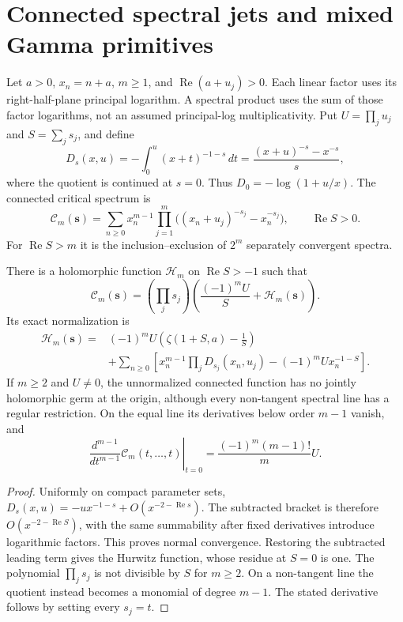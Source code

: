 \section{Connected spectral jets and mixed Gamma primitives}
\label{connected:section}
Let $a>0$, $x_n=n+a$, $m\ge1$, and $\operatorname{Re}(a+u_j)>0$.
Each linear factor uses its right-half-plane principal logarithm. A spectral
product uses the sum of those factor logarithms, not an assumed principal-log
multiplicativity. Put $U=\prod_j u_j$ and $S=\sum_j s_j$, and define
\[
 D_s(x,u)=-\int_0^u(x+t)^{-1-s}\,dt
 =\frac{(x+u)^{-s}-x^{-s}}s,
\]
where the quotient is continued at $s=0$. Thus $D_0=-\log(1+u/x)$.
The connected critical spectrum is
\[
 \mathcal C_m(\boldsymbol{s})
 =\sum_{n\ge0}x_n^{m-1}
    \prod_{j=1}^m\bigl((x_n+u_j)^{-s_j}-x_n^{-s_j}\bigr),
 \qquad\operatorname{Re}S>0.
\]
For $\operatorname{Re}S>m$ it is the inclusion--exclusion of $2^m$ separately
convergent spectra.

\begin{theorem}\label{connected:germ}
There is a holomorphic function $\mathcal H_m$ on
$\operatorname{Re}S>-1$ such that
\begin{equation}\label{connected:pole}
 \mathcal C_m(\boldsymbol{s})=
 \left(\prod_js_j\right)
 \left(\frac{(-1)^mU}{S}+\mathcal H_m(\boldsymbol{s})\right).
\end{equation}
Its exact normalization is
\begin{align*}
 \mathcal H_m(\boldsymbol{s})={}&(-1)^mU
       \left(\zeta(1+S,a)-\frac1S\right)\\
 &+\sum_{n\ge0}\left[x_n^{m-1}\prod_jD_{s_j}(x_n,u_j)
                      -(-1)^mU x_n^{-1-S}\right].
\end{align*}
If $m\ge2$ and $U\ne0$, the unnormalized connected function has no jointly
holomorphic germ at the origin, although every non-tangent spectral line
has a regular restriction. On the equal line its derivatives below order
$m-1$ vanish, and
\[
 \left.\frac{d^{m-1}}{dt^{m-1}}\mathcal C_m(t,\ldots,t)\right|_{t=0}
 =\frac{(-1)^m(m-1)!}{m}U.
\]
\end{theorem}
\begin{proof}
Uniformly on compact parameter sets,
$D_s(x,u)=-u x^{-1-s}+O(x^{-2-\operatorname{Re}s})$.
The subtracted bracket is therefore $O(x^{-2-\operatorname{Re}S})$,
with the same summability after fixed derivatives introduce logarithmic
factors. This proves normal convergence. Restoring the subtracted leading
term gives the Hurwitz function, whose residue at $S=0$ is one.
The polynomial $\prod_js_j$ is not divisible by $S$ for $m\ge2$.
On a non-tangent line the quotient instead becomes a monomial of degree
$m-1$. The stated derivative follows by setting every $s_j=t$.
\end{proof}


